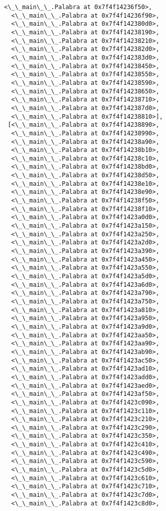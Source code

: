 \documentclass[12pt,a4paper,table]{article}
\begin{document}
\begin{tcolorbox}[breakable, size=fbox, boxrule=.5pt, pad at break*=1mm, opacityfill=0]
\begin{Verbatim}[commandchars=\\\{\}]
  <\_\_main\_\_.Palabra at 0x7f4f14236f50>,
  <\_\_main\_\_.Palabra at 0x7f4f14236f90>,
  <\_\_main\_\_.Palabra at 0x7f4f142380d0>,
  <\_\_main\_\_.Palabra at 0x7f4f14238190>,
  <\_\_main\_\_.Palabra at 0x7f4f14238210>,
  <\_\_main\_\_.Palabra at 0x7f4f142382d0>,
  <\_\_main\_\_.Palabra at 0x7f4f142383d0>,
  <\_\_main\_\_.Palabra at 0x7f4f14238450>,
  <\_\_main\_\_.Palabra at 0x7f4f14238550>,
  <\_\_main\_\_.Palabra at 0x7f4f14238590>,
  <\_\_main\_\_.Palabra at 0x7f4f14238650>,
  <\_\_main\_\_.Palabra at 0x7f4f14238710>,
  <\_\_main\_\_.Palabra at 0x7f4f142387d0>,
  <\_\_main\_\_.Palabra at 0x7f4f14238810>],
 [<\_\_main\_\_.Palabra at 0x7f4f14238890>,
  <\_\_main\_\_.Palabra at 0x7f4f14238990>,
  <\_\_main\_\_.Palabra at 0x7f4f14238a90>,
  <\_\_main\_\_.Palabra at 0x7f4f14238b10>,
  <\_\_main\_\_.Palabra at 0x7f4f14238c10>,
  <\_\_main\_\_.Palabra at 0x7f4f14238bd0>,
  <\_\_main\_\_.Palabra at 0x7f4f14238d50>,
  <\_\_main\_\_.Palabra at 0x7f4f14238e10>,
  <\_\_main\_\_.Palabra at 0x7f4f14238e90>,
  <\_\_main\_\_.Palabra at 0x7f4f14238f50>,
  <\_\_main\_\_.Palabra at 0x7f4f14238f10>,
  <\_\_main\_\_.Palabra at 0x7f4f1423a0d0>,
  <\_\_main\_\_.Palabra at 0x7f4f1423a150>,
  <\_\_main\_\_.Palabra at 0x7f4f1423a250>,
  <\_\_main\_\_.Palabra at 0x7f4f1423a2d0>,
  <\_\_main\_\_.Palabra at 0x7f4f1423a390>,
  <\_\_main\_\_.Palabra at 0x7f4f1423a450>,
  <\_\_main\_\_.Palabra at 0x7f4f1423a550>,
  <\_\_main\_\_.Palabra at 0x7f4f1423a5d0>,
  <\_\_main\_\_.Palabra at 0x7f4f1423a6d0>,
  <\_\_main\_\_.Palabra at 0x7f4f1423a790>,
  <\_\_main\_\_.Palabra at 0x7f4f1423a750>,
  <\_\_main\_\_.Palabra at 0x7f4f1423a810>,
  <\_\_main\_\_.Palabra at 0x7f4f1423a950>,
  <\_\_main\_\_.Palabra at 0x7f4f1423a9d0>,
  <\_\_main\_\_.Palabra at 0x7f4f1423aa50>,
  <\_\_main\_\_.Palabra at 0x7f4f1423aa90>,
  <\_\_main\_\_.Palabra at 0x7f4f1423ab90>,
  <\_\_main\_\_.Palabra at 0x7f4f1423ac50>,
  <\_\_main\_\_.Palabra at 0x7f4f1423ad10>,
  <\_\_main\_\_.Palabra at 0x7f4f1423add0>,
  <\_\_main\_\_.Palabra at 0x7f4f1423aed0>,
  <\_\_main\_\_.Palabra at 0x7f4f1423af50>,
  <\_\_main\_\_.Palabra at 0x7f4f1423c090>,
  <\_\_main\_\_.Palabra at 0x7f4f1423c110>,
  <\_\_main\_\_.Palabra at 0x7f4f1423c210>,
  <\_\_main\_\_.Palabra at 0x7f4f1423c290>,
  <\_\_main\_\_.Palabra at 0x7f4f1423c350>,
  <\_\_main\_\_.Palabra at 0x7f4f1423c410>,
  <\_\_main\_\_.Palabra at 0x7f4f1423c490>,
  <\_\_main\_\_.Palabra at 0x7f4f1423c590>,
  <\_\_main\_\_.Palabra at 0x7f4f1423c5d0>,
  <\_\_main\_\_.Palabra at 0x7f4f1423c610>,
  <\_\_main\_\_.Palabra at 0x7f4f1423c710>,
  <\_\_main\_\_.Palabra at 0x7f4f1423c7d0>,
  <\_\_main\_\_.Palabra at 0x7f4f1423c8d0>,

\end{Verbatim}
\end{tcolorbox}
\end{document}
